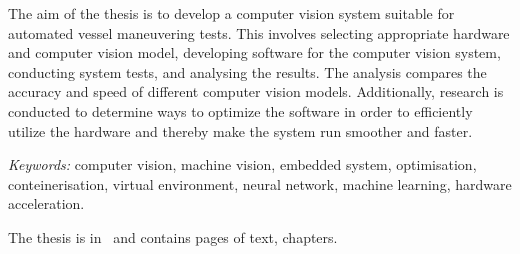 The aim of the thesis is to develop a computer vision system suitable for automated vessel maneuvering tests. This involves selecting appropriate hardware and computer vision model, developing software for the computer vision system, conducting system tests, and analysing the results. The analysis compares the accuracy and speed of different computer vision models. Additionally, research is conducted to determine ways to optimize the software in order to efficiently utilize the hardware and thereby make the system run smoother and faster.

\textit{Keywords:} computer vision, machine vision, embedded system, optimisation, conteinerisation, virtual environment, neural network, machine learning, hardware acceleration.

The thesis is in \langEng~and contains \calculatepages pages of text,
 chapters.
